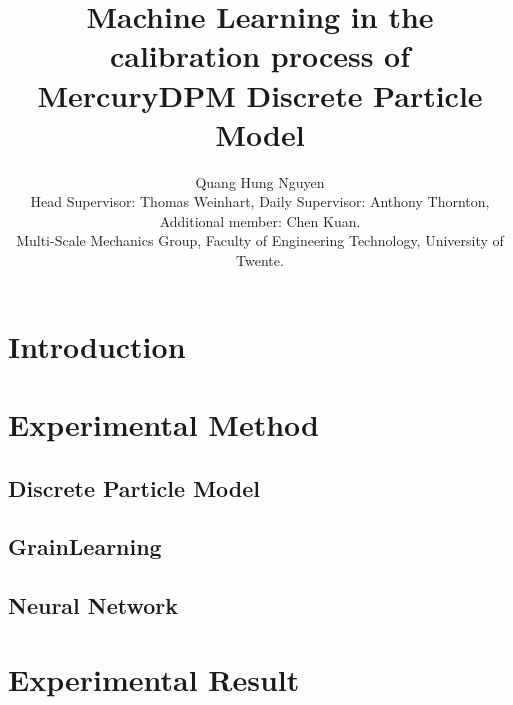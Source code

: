 \documentclass{article}
\title{Machine Learning in the calibration process of MercuryDPM Discrete Particle Model}
\author{Quang Hung Nguyen\\[1ex] \small Head Supervisor: Thomas Weinhart, Daily Supervisor: Anthony Thornton, Additional member: Chen Kuan. \\
\small Multi-Scale Mechanics Group, Faculty of Engineering Technology, University of Twente.}
\date{}
\begin{document}
\maketitle
\section{Introduction}\label{section:Introduction}



% 


% 



\section{Experimental Method}\label{section:Calibration}


\subsection{Discrete Particle Model}



\subsection{GrainLearning}



\subsection{Neural Network}


\section{Experimental Result}\label{section:ExperimentalSection}

\pagebreak  


\end{document}
